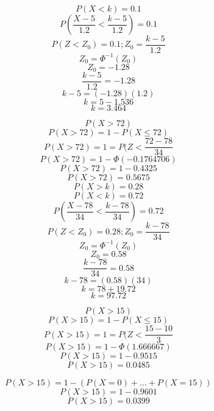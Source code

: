 $$P(X<k)=0.1$$
$$P(\frac{X-5}{1.2}<\frac{k-5}{1.2})=0.1$$
$$P(Z<Z_{0})=0.1;Z_{0}=\frac{k-5}{1.2}$$
$$Z_{0}=\Phi^{-1}(Z_{0})$$
$$Z_{0}=-1.28$$
$$\frac{k-5}{1.2}=-1.28$$
$$k-5=(-1.28)(1.2)$$
$$k=5-1.536$$
$$k=3.464$$

$$P(X>72)$$
$$P(X>72)=1-P(X\leq72)$$
$$P(X>72)=1=P(Z<\frac{72-78}{34}$$
$$P(X>72)=1-\Phi(-0.1764706)$$
$$P(X>72)=1-0.4325$$
$$P(X>72)=0.5675$$
$$P(X>k)=0.28$$
$$P(X<k)=0.72$$
$$P(\frac{X-78}{34}<\frac{k-78}{34})=0.72$$
$$P(Z<Z_{0})=0.28;Z_{0}=\frac{k-78}{34}$$
$$Z_{0}=\Phi^{-1}(Z_{0})$$
$$Z_{0}=0.58$$
$$\frac{k-78}{34}=0.58$$
$$k-78=(0.58)(34)$$
$$k=78+19.72$$
$$k=97.72$$

$$P(X>15)$$
$$P(X>15)=1-P(X\leq15)$$
$$P(X>15)=1=P(Z<\frac{15-10}{3}$$
$$P(X>15)=1-\Phi(1.666667)$$
$$P(X>15)=1-0.9515$$
$$P(X>15)=0.0485$$

$$P(X>15)=1-(P(X=0)+...+P(X=15))$$
$$P(X>15)=1-0.9601$$
$$P(X>15)=0.0399$$

